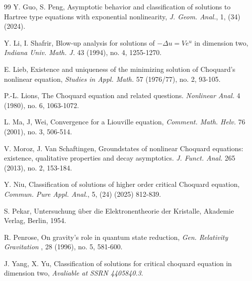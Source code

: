 \documentclass[11pt]{article}
\begin{document}
\begin{thebibliography}{99}
Y. Guo, S. Peng, Asymptotic behavior and classification of solutions to Hartree type equations with exponential nonlinearity, \emph{J. Geom. Anal.}, 1, (34) (2024).

Y. Li, I. Shafrir, Blow-up analysis for solutions of $-\Delta u=Ve^u$ in dimension two, \emph{Indiana Univ. Math. J.} 43 (1994), no. 4, 1255-1270.

E. Lieb, Existence and uniqueness of the minimizing solution of Choquard's nonlinear equation, \emph{Studies in Appl. Math.} 57 (1976/77), no. 2, 93-105.

P.-L. Lions, The Choquard equation and related questions.
\emph{Nonlinear Anal.} 4 (1980), no. 6, 1063-1072.

L. Ma, J, Wei, Convergence for a Liouville equation, \emph{Comment. Math. Helv.} 76 (2001), no. 3, 506-514.

V. Moroz, J. Van Schaftingen, Groundstates of nonlinear Choquard equations: existence, qualitative properties and decay asymptotics. \emph{J. Funct. Anal.} 265 (2013), no. 2, 153-184.

Y. Niu, Classification of solutions of higher order critical Choquard equation, \emph{Commun. Pure Appl. Anal.}, 5, (24) (2025) 812-839.

S. Pekar, Untersuchung \"uber die Elektronentheorie der Kristalle, Akademie Verlag, Berlin, 1954.

R. Penrose, On gravity's role in quantum state reduction, \emph{ Gen. Relativity Gravitation }, 28 (1996), no. 5, 581-600.

J. Yang, X. Yu, Classification of solutions for critical choquard equation in dimension two, \emph{Avaliable at SSRN 4405840.3}.

\end{thebibliography}
\end{document}

